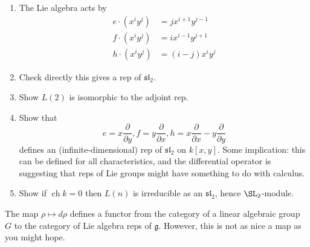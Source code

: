 \documentclass[a4paper]{article}
\newcommand*{\Lie}[1]{\mathfrak{#1}} %
\DeclareMathOperator{\cha}{ch} %
\begin{document}
\begin{ex}\leavevmode
  \begin{enumerate}
  \item The Lie algebra acts by
    \begin{align*}
      e \cdot (x^iy^j) &= jx^{i + 1} y^{j - 1} \\
      f \cdot (x^iy^j) &= ix^{i - 1} y^{j + 1} \\
      h \cdot (x^iy^j) &= (i - j) x^iy^j
    \end{align*}
  \item Check directly this gives a rep of \(\Lie{sl}_2\).
  \item Show \(L(2)\) is isomorphic to the adjoint rep.
  \item Show that
    \[
      e = x \frac{\partial  }{\partial y}, f = y \frac{\partial  }{\partial x}, h = x \frac{\partial  }{\partial x} - y \frac{\partial  }{\partial y}
    \]
    defines an (infinite-dimensional) rep of \(\Lie{sl}_2\) on \(k[x, y]\). Some implication: this can be defined for all characteristics, and the differential operator is suggesting that reps of Lie groups might have something to do with calculus.
  \item Show if \(\cha k = 0\) then \(L(n)\) is irreducible as an \(\Lie{sl}_2\), hence \(\SL_2\)-module.
  \end{enumerate}
\end{ex}

The map \(\rho \mapsto d \rho\) defines a functor from the category of a linear algebraic group \(G\) to the category of Lie algebra reps of \(\Lie g\). However, this is not as nice a map as you might hope.
\end{document}
